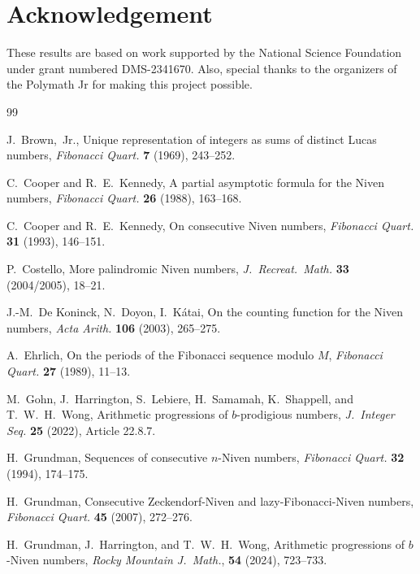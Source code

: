 \documentclass[12pt]{article}
\theoremstyle{definition}
\begin{document}
\section{Acknowledgement}\label{sec:acknowledgement}

These results are based on work supported by the National Science Foundation under grant numbered DMS-2341670. Also, special thanks to the organizers of the Polymath Jr for making this project possible.





\begin{thebibliography}{99}

J.~Brown,~Jr., Unique representation of integers as sums of distinct Lucas numbers, \textit{Fibonacci Quart.\/} \textbf{7} (1969), 243--252.

C.~Cooper and R.~E.~Kennedy, A partial asymptotic formula for the Niven numbers, \textit{Fibonacci Quart.\/} \textbf{26} (1988), 163--168.

C.~Cooper and R.~E.~Kennedy, On consecutive Niven numbers, \textit{Fibonacci Quart.\/} \textbf{31} (1993), 146--151.

P.~Costello, More palindromic Niven numbers, \textit{J.\ Recreat.\ Math.\/} \textbf{33} (2004/2005), 18--21.

J.-M.~De Koninck, N.~Doyon, I.~K\'{a}tai, On the counting function for the Niven numbers, \textit{Acta Arith.\/} \textbf{106} (2003), 265--275.

A.~Ehrlich, On the periods of the Fibonacci sequence modulo $M$, \textit{Fibonacci Quart.\/} \textbf{27} (1989), 11--13.

M.~Gohn, J.~Harrington, S.~Lebiere, H.~Samamah, K.~Shappell, and T.~W.~H.~Wong, Arithmetic progressions of $b$-prodigious numbers, \textit{J.\ Integer Seq.\/} \textbf{25} (2022), Article 22.8.7.

H.~Grundman, Sequences of consecutive $n$-Niven numbers, \textit{Fibonacci Quart.\/} \textbf{32} (1994), 174--175.

H.~Grundman, Consecutive Zeckendorf-Niven and lazy-Fibonacci-Niven numbers, \textit{Fibonacci Quart.\/} \textbf{45} (2007), 272--276.

H.~Grundman, J.~Harrington, and T.~W.~H.~Wong, Arithmetic progressions of $b$-Niven numbers, \textit{Rocky Mountain J.\ Math.\/}, \textbf{54} (2024), 723--733.


\end{thebibliography}
\end{document}
